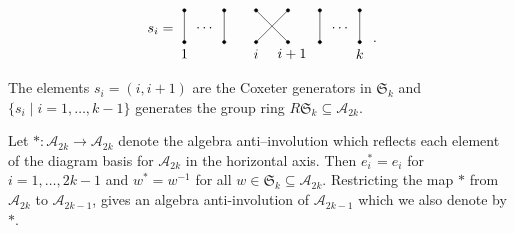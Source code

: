 \documentclass[11pt,a4paper,reqno,svgnames]{amsart}
\theoremstyle{plain}
\theoremstyle{definition}
\numberwithin{equation}{section}
\begin{document}
\begin{align*}
\begin{matrix}
\begin{tikzpicture}
\node at (-7.4,-0.5) {$\displaystyle {s_i}= \color{black}$};
\node at (-6.3,-0.45) {$\displaystyle \cdots \color{black}$};
\draw (-6.8,0) -- (-6.8,-0.8);
\draw (-5.8,0) -- (-5.8,-0.8);
\draw (-5,0) -- (-4.2,-0.8);
\draw (-5,-0.8) -- (-4.2,-0.0);
\draw (-3.4,0) -- (-3.4,-0.8);
\draw (-2.4,0) -- (-2.4,-0.8);
\filldraw [black] (-6.8,0) circle (1.2pt);
\filldraw [black] (-6.8,-0.8) circle (1.2pt);
\filldraw [black] (-5.8,0) circle (1.2pt);
\filldraw [black] (-5.8,-0.8) circle (1.2pt);
\filldraw [black] (-5.0,0) circle (1.2pt);
\filldraw [black] (-5.0,-0.8) circle (1.2pt);
\filldraw [black] (-4.2,0) circle (1.2pt);
\filldraw [black] (-4.2,-0.8) circle (1.2pt);
\filldraw [black] (-3.4,0) circle (1.2pt);
\filldraw [black] (-3.4,-0.8) circle (1.2pt);
\filldraw [black] (-2.4,0) circle (1.2pt);
\filldraw [black] (-2.4,-0.8) circle (1.2pt);
\node at (-2.9,-0.45) {$\displaystyle \cdots \color{black}$};
\node at (-6.8,-1.1) {$\displaystyle 1 \color{black}$};
\node at (-5.0,-1.1) {$\displaystyle i \color{black}$};
\node at (-4.1,-1.1) {$\displaystyle i+1 \color{black}$};
\node at (-2.4,-1.1) {$\displaystyle k \color{black}$};
\end{tikzpicture}
\end{matrix}\ .
\end{align*}
The elements $s_i=(i,i+1)$ are the Coxeter generators in $\mathfrak{S}_k$ and ${\lbrace}s_i\mid i=1,\ldots,k-1{\rbrace}$ generates the group ring $R\mathfrak{S}_k\subseteq \mathcal{A}_{2k}$.

Let $*:\mathcal{A}_{2k}\to \mathcal{A}_{2k}$ denote the algebra anti--involution which reflects each element of the diagram basis for $\mathcal{A}_{2k}$ in the horizontal axis. Then $e_{i}^*=e_{i}$ for $i=1,\ldots,2k-1$ and $w^*=w^{-1}$ for all $w\in\mathfrak{S}_k\subseteq \mathcal{A}_{2k}$. Restricting the map $*$ from $\mathcal{A}_{2k}$ to $\mathcal{A}_{2k-1}$, gives an algebra anti-involution of $\mathcal{A}_{2k-1}$ which we also denote by $*$.  
\end{document}
